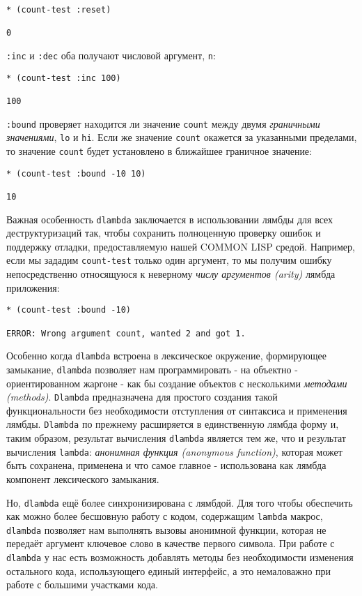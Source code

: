 \begin{verbatim}
* (count-test :reset)

0
\end{verbatim}

\verb":inc" и \verb":dec" оба получают числовой аргумент, \verb"n":

\begin{verbatim}
* (count-test :inc 100)

100
\end{verbatim}

\verb":bound" проверяет находится ли значение \verb"count" между двумя \emph{граничными значениями}, \verb"lo" и \verb"hi". Если же значение \verb"count" окажется за указанными пределами, то значение \verb"count" будет установлено в ближайшее граничное значение:

\begin{verbatim}
* (count-test :bound -10 10)

10
\end{verbatim}

Важная особенность \verb"dlambda" заключается в использовании лямбды для всех деструктуризаций так, чтобы сохранить полноценную проверку ошибок и поддержку отладки, предоставляемую нашей COMMON LISP средой. Например, если мы зададим \verb"count-test" только один аргумент, то мы получим ошибку непосредственно относящуюся к неверному \emph{числу аргументов (arity)} лямбда приложения:

\begin{verbatim}
* (count-test :bound -10)

ERROR: Wrong argument count, wanted 2 and got 1.
\end{verbatim}

Особенно когда \verb"dlambda" встроена в лексическое окружение, формирующее замыкание, \verb"dlambda" позволяет нам программировать - на объектно - ориентированном жаргоне - как бы создание объектов с несколькими \emph{методами (methods)}. \verb"Dlambda" предназначена для простого создания такой функциональности без необходимости отступления от синтаксиса и применения лямбды. \verb"Dlambda" по прежнему расширяется в единственную лямбда форму и, таким образом, результат вычисления \verb"dlambda" является тем же, что и результат вычисления \verb"lambda": \emph{анонимная функция (anonymous function)}, которая может быть сохранена, применена и что самое главное - использована как лямбда компонент лексического замыкания.

Но, \verb"dlambda" ещё более синхронизирована с лямбдой. Для того чтобы обеспечить как можно более бесшовную работу с кодом, содержащим \verb"lambda" макрос, \verb"dlambda" позволяет нам выполнять вызовы анонимной функции, которая не передаёт аргумент ключевое слово в качестве первого символа. При работе с \verb"dlambda" у нас есть возможность добавлять методы без необходимости изменения остального кода, использующего единый интерфейс, а это немаловажно при работе с большими участками кода.

